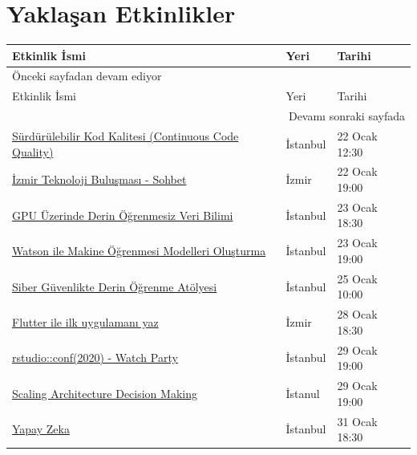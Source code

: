 \documentclass[11pt]{article}
\begin{document}
\section{Yaklaşan Etkinlikler}
\label{sec:orge68b26a}
\begin{longtable}{|p{8cm}|l|l|}
\hline
Etkinlik İsmi & Yeri & Tarihi\\
\hline
\endfirsthead
\multicolumn{3}{l}{Önceki sayfadan devam ediyor} \\
\hline

Etkinlik İsmi & Yeri & Tarihi \\

\hline
\endhead
\hline\multicolumn{3}{r}{Devamı sonraki sayfada} \\
\endfoot
\endlastfoot
\hline
\href{https://www.meetup.com/Teknopark-\%25C4\%25B0stanbul-Yaz\%25C4\%25B1l\%25C4\%25B1mc\%25C4\%25B1-Bulu\%25C5\%259Fmalar\%25C4\%25B1/events/267785470/}{Sürdürülebilir Kod Kalitesi (Continuous Code Quality)} & İstanbul & 22 Ocak 12:30\\
\href{https://kommunity.com/izmir-teknoloji-bulusmasi-sohbet/events/izmir-teknoloji-bulusmasi-sohbet}{İzmir Teknoloji Buluşması - Sohbet} & İzmir & 22 Ocak 19:00\\
\href{https://www.meetup.com/S-Data-Science/events/267905267/}{GPU Üzerinde Derin Öğrenmesiz Veri Bilimi} & İstanbul & 23 Ocak 18:30\\
\href{https://www.meetup.com/IBMCloudTR/events/267829562/}{Watson ile Makine Öğrenmesi Modelleri Oluşturma} & İstanbul & 23 Ocak 19:00\\
\href{https://www.meetup.com/istanbul-yapay-zeka-toplulugu/events/267585252/}{Siber Güvenlikte Derin Öğrenme Atölyesi} & İstanbul & 25 Ocak 10:00\\
\href{https://www.meetup.com/GDG-Izmir/events/268014757/}{Flutter ile ilk uygulamanı yaz} & İzmir & 28 Ocak 18:30\\
\href{https://www.meetup.com/rladies-istanbul/events/267636455/}{rstudio::conf(2020) - Watch Party} & İstanbul & 29 Ocak 19:00\\
\href{https://www.meetup.com/trendyol/events/267607677/}{Scaling Architecture Decision Making} & İstanul & 29 Ocak 19:00\\
\href{https://www.meetup.com/\%25C4\%25B0tu-Ar\%25C4\%25B1-Teknokent-Yaz\%25C4\%25B1l\%25C4\%25B1mc\%25C4\%25B1-Bulu\%25C5\%259Fmalar\%25C4\%25B1/events/267877408/}{Yapay Zeka} & İstanbul & 31 Ocak 18:30\\
\hline
\end{longtable}
\end{document}
